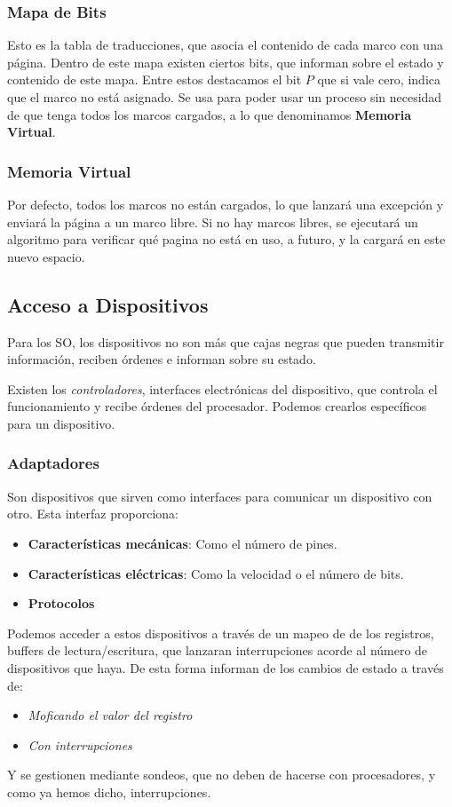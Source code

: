 \subsubsection{Mapa de Bits}
\noindent Esto es la tabla de traducciones, que asocia el contenido de cada marco con una página. Dentro de este mapa existen ciertos bits, que informan sobre el estado y contenido de este mapa. Entre estos destacamos el bit \(P\) que si vale cero, indica que el marco no está asignado. Se usa para poder usar un proceso sin necesidad de que tenga todos los marcos cargados, a lo que denominamos \textbf{Memoria Virtual}.
\subsubsection{Memoria Virtual}
\noindent Por defecto, todos los marcos no están cargados, lo que lanzará una excepción y enviará la página a un marco libre. Si no hay marcos libres, se ejecutará un algoritmo para verificar qué pagina no está en uso, a futuro, y la cargará en este nuevo espacio.
\subsection{Acceso a Dispositivos}
\noindent Para los SO, los dispositivos no son más que cajas negras que pueden transmitir información, reciben órdenes e informan sobre su estado.
\par \noindent Existen los \textit{controladores}, interfaces electrónicas del dispositivo, que controla el funcionamiento y recibe órdenes del procesador. Podemos crearlos específicos para un dispositivo.
\subsubsection{Adaptadores}
\noindent Son dispositivos que sirven como interfaces para comunicar un dispositivo con otro. Esta interfaz proporciona:
\begin{itemize}
        \item \textbf{Características mecánicas}: Como el número de pines.
        \item \textbf{Características eléctricas}: Como la velocidad o el número de bits.
        \item \textbf{Protocolos}
\end{itemize}
\noindent Podemos acceder a estos dispositivos a través de un mapeo de de los registros, buffers de lectura/escritura, que lanzaran interrupciones acorde al número de dispositivos que haya. De esta forma informan de los cambios de estado a través de:
\begin{itemize}
        \item \textit{Moficando el valor del registro}
        \item \textit{Con interrupciones}
\end{itemize}
\noindent Y se gestionen mediante sondeos, que no deben de hacerse con procesadores, y como ya hemos dicho, interrupciones.
